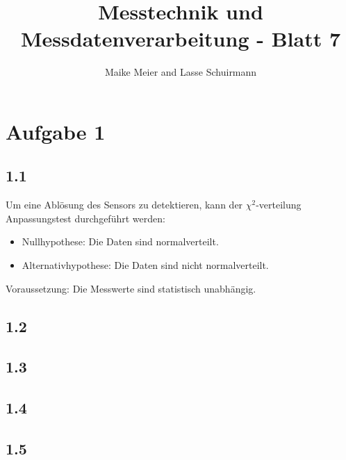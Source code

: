 \documentclass[12pt,a4paper]{article}
\author{Maike Meier and Lasse Schuirmann}
\title{Messtechnik und Messdatenverarbeitung - Blatt 7}
\begin{document}
\maketitle

\section*{Aufgabe 1}
\subsection*{1.1}
Um eine Ablösung des Sensors zu detektieren, kann der $\chi^2$-verteilung Anpassungstest durchgeführt werden:

\begin{itemize}
\item Nullhypothese: Die Daten sind normalverteilt.
\item Alternativhypothese: Die Daten sind nicht normalverteilt.
\end{itemize}

Voraussetzung: Die Messwerte sind statistisch unabhängig.
\subsection*{1.2}

\subsection*{1.3}
\subsection*{1.4}
\subsection*{1.5}
\end{document}
